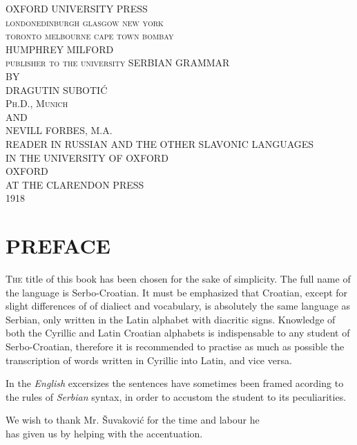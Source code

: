\documentclass[11pt]{book}
\begin{document}
\begin{titlepage}
    \begin{center}
        \vspace*{\fill}
        {\large OXFORD UNIVERSITY PRESS}\\
        \textsc{london\qquad edinburgh \qquad glasgow \qquad new york}\\
        \textsc{toronto \quad melbourne \quad cape town \quad bombay}\\[4pt]
        {\large HUMPHREY MILFORD}\\
        \textsc{\footnotesize publisher to the university}
        \vspace*{\fill}
        \newpage
        {\Huge SERBIAN GRAMMAR}\\
        \vspace{0.5cm}
        BY\\
        \vspace{0.5cm}
        {\Large DRAGUTIN SUBOTIĆ}\\[5pt]
        \textsc{Ph.D., Munich}\\
        \vspace{0.5cm}
        AND\\
        \vspace{0.5cm}
        {\Large NEVILL FORBES, M.A.}\\[5pt]
        {\scriptsize READER IN RUSSIAN AND THE OTHER SLAVONIC LANGUAGES}\\
        {\scriptsize IN THE UNIVERSITY OF OXFORD}\\
        \vfill
        {\large OXFORD}\\
        {\large AT THE CLARENDON PRESS}\\
        {\large 1918}
    \end{center}
\end{titlepage}
\null\newpage

\part*{\LARGE PREFACE}

{\onehalfspacing \large \textsc{The} title of this book has been chosen for the sake of simplicity. The
full name of the language is Serbo-Croatian. It must be emphasized that
Croatian, except for slight differences of of dialiect and vocabulary, is
absolutely the same language as Serbian, only written in the Latin alphabet
with diacritic signs. Knowledge of both the Cyrillic and Latin {Croatian}
alphabets is indispensable to any student of Serbo-Croatian, therefore it is
recommended to practise as much as possible the transcription of words written
in Cyrillic into Latin, and vice versa.

In the \textit{English} excersizes the sentences have sometimes been framed
acording to the rules of \textit{Serbian} syntax, in order to accustom the
student to its peculiarities.

We wish to thank Mr. \v{S}uvakovi\'{c} for the time and labour he\\[1.5pt]  
has given us by helping with the accentuation.}
\end{document}
